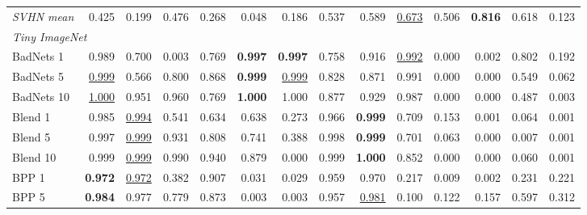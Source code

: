 \begin{table}[htbp]
\begin{adjustbox}{max width=\textwidth}
\begin{tabular}{lrrrrrrrrrrrrr}
\rowcolor{black!8}\emph{SVHN mean} & \textcolor{black!45}{0.425} & \textcolor{black!45}{0.199} & \textcolor{black!45}{0.476} & \textcolor{black!45}{0.268} & \textcolor{black!45}{0.048} & \textcolor{black!45}{0.186} & 0.537 & 0.589 & \underline{0.673} & 0.506 & \textbf{0.816} & 0.618 & \textcolor{black!45}{0.123} \\
\multicolumn{14}{l}{\emph{Tiny ImageNet}} \\
BadNets 1 & 0.989 & 0.700 & \textcolor{black!45}{0.003} & 0.769 & \textbf{0.997} & \textbf{0.997} & 0.758 & 0.916 & \underline{0.992} & \textcolor{black!45}{0.000} & \textcolor{black!45}{0.002} & 0.802 & \textcolor{black!45}{0.192} \\
BadNets 5 & \underline{0.999} & 0.566 & 0.800 & 0.868 & \textbf{0.999} & \underline{0.999} & 0.828 & 0.871 & 0.991 & \textcolor{black!45}{0.000} & \textcolor{black!45}{0.000} & 0.549 & \textcolor{black!45}{0.062} \\
BadNets 10 & \underline{1.000} & 0.951 & 0.960 & 0.769 & \textbf{1.000} & 1.000 & 0.877 & 0.929 & 0.987 & \textcolor{black!45}{0.000} & \textcolor{black!45}{0.000} & \textcolor{black!45}{0.487} & \textcolor{black!45}{0.003} \\
Blend 1 & 0.985 & \underline{0.994} & 0.541 & 0.634 & 0.638 & \textcolor{black!45}{0.273} & 0.966 & \textbf{0.999} & 0.709 & \textcolor{black!45}{0.153} & \textcolor{black!45}{0.001} & \textcolor{black!45}{0.064} & \textcolor{black!45}{0.001} \\
Blend 5 & 0.997 & \underline{0.999} & 0.931 & 0.808 & 0.741 & \textcolor{black!45}{0.388} & 0.998 & \textbf{0.999} & 0.701 & \textcolor{black!45}{0.063} & \textcolor{black!45}{0.000} & \textcolor{black!45}{0.007} & \textcolor{black!45}{0.001} \\
Blend 10 & 0.999 & \underline{0.999} & 0.990 & 0.940 & 0.879 & \textcolor{black!45}{0.000} & 0.999 & \textbf{1.000} & 0.852 & \textcolor{black!45}{0.000} & \textcolor{black!45}{0.000} & \textcolor{black!45}{0.060} & \textcolor{black!45}{0.001} \\
BPP 1 & \textbf{0.972} & \underline{0.972} & \textcolor{black!45}{0.382} & 0.907 & \textcolor{black!45}{0.031} & \textcolor{black!45}{0.029} & 0.959 & 0.970 & \textcolor{black!45}{0.217} & \textcolor{black!45}{0.009} & \textcolor{black!45}{0.002} & \textcolor{black!45}{0.231} & \textcolor{black!45}{0.221} \\
BPP 5 & \textbf{0.984} & 0.977 & 0.779 & 0.873 & \textcolor{black!45}{0.003} & \textcolor{black!45}{0.003} & 0.957 & \underline{0.981} & \textcolor{black!45}{0.100} & \textcolor{black!45}{0.122} & \textcolor{black!45}{0.157} & 0.597 & \textcolor{black!45}{0.312} \\

\end{tabular}
\end{adjustbox}
\end{table}

